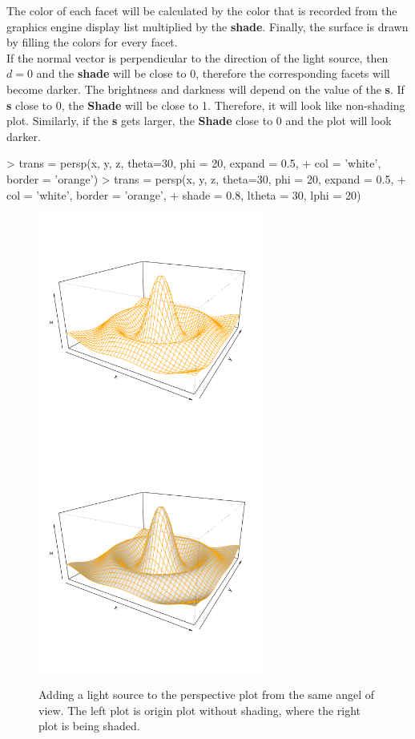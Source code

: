 \documentclass{report}
\begin{document}
The color of each facet will be calculated by the color that is recorded from the graphics engine display list multiplied by the \textbf{shade}. Finally, the surface is drawn by filling the colors for every facet.\\

If the normal vector is perpendicular to the direction of the light source, then $d = 0$ and the \textbf{shade} will be close to 0, therefore the corresponding facets will become darker. The brightness and darkness will depend on the value of the \textbf{s}. If \textbf{s} close to 0, the \textbf{Shade} will be close to 1. Therefore, it will look like non-shading plot. Similarly, if the \textbf{s} gets larger, the \textbf{Shade} close to 0 and the plot will look darker.

\begin{Schunk}
\begin{Sinput}
> trans = persp(x, y, z, theta=30, phi = 20, expand = 0.5,
+               col = 'white', border = 'orange')
> trans = persp(x, y, z, theta=30, phi = 20, expand = 0.5,
+               col = 'white', border = 'orange', 
+               shade = 0.8, ltheta = 30, lphi = 20)
\end{Sinput}
\end{Schunk}


\begin{figure}[h]
	\begin{center}
		\includegraphics[height = 7.5cm, width = 7.5cm]{figure/Lighting_1.pdf}
		\includegraphics[height = 7.5cm, width = 7.5cm]{figure/Lighting_2.pdf}
		\caption{Adding a light source to the perspective plot from the same angel of view. The left plot is origin plot without shading, where the right plot is being shaded.}
		\label{figure_3.3}
	\end{center}
\end{figure}
\end{document}
